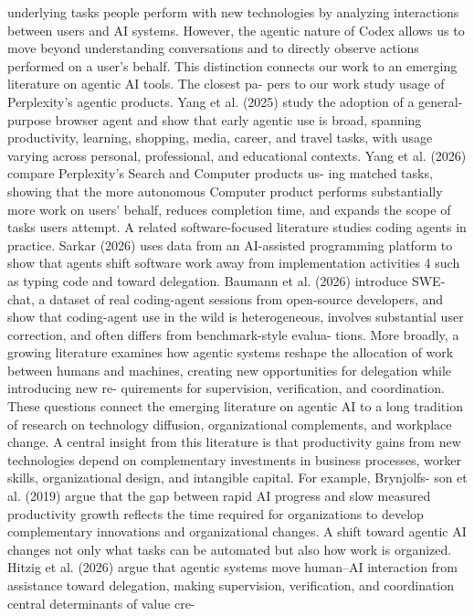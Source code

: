 underlying tasks people perform with new technologies by analyzing interactions between users and AI
systems. However, the agentic nature of Codex allows us to move beyond understanding conversations
and to directly observe actions performed on a user’s behalf.
This distinction connects our work to an emerging literature on agentic AI tools. The closest pa-
pers to our work study usage of Perplexity’s agentic products. Yang et al. (2025) study the adoption
of a general-purpose browser agent and show that early agentic use is broad, spanning productivity,
learning, shopping, media, career, and travel tasks, with usage varying across personal, professional,
and educational contexts. Yang et al. (2026) compare Perplexity’s Search and Computer products us-
ing matched tasks, showing that the more autonomous Computer product performs substantially more
work on users’ behalf, reduces completion time, and expands the scope of tasks users attempt. A related
software-focused literature studies coding agents in practice. Sarkar (2026) uses data from an AI-assisted
programming platform to show that agents shift software work away from implementation activities
4
such as typing code and toward delegation. Baumann et al. (2026) introduce SWE-chat, a dataset of
real coding-agent sessions from open-source developers, and show that coding-agent use in the wild
is heterogeneous, involves substantial user correction, and often differs from benchmark-style evalua-
tions. More broadly, a growing literature examines how agentic systems reshape the allocation of work
between humans and machines, creating new opportunities for delegation while introducing new re-
quirements for supervision, verification, and coordination.
These questions connect the emerging literature on agentic AI to a long tradition of research on
technology diffusion, organizational complements, and workplace change. A central insight from this
literature is that productivity gains from new technologies depend on complementary investments in
business processes, worker skills, organizational design, and intangible capital. For example, Brynjolfs-
son et al. (2019) argue that the gap between rapid AI progress and slow measured productivity growth
reflects the time required for organizations to develop complementary innovations and organizational
changes.
A shift toward agentic AI changes not only what tasks can be automated but also how work is
organized. Hitzig et al. (2026) argue that agentic systems move human–AI interaction from assistance
toward delegation, making supervision, verification, and coordination central determinants of value cre-
